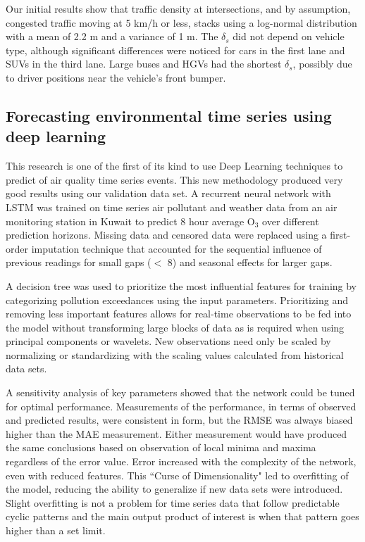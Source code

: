 Our initial results show that traffic density at intersections, and by assumption, congested traffic moving at 5 km/h or less, stacks using a log-normal distribution with a mean of 2.2 m and a variance of 1 m. The $\delta_{s}$ did not depend on vehicle type, although significant differences were noticed for cars in the first lane and SUVs in the third lane. Large buses and HGVs had the shortest $\delta_{s}$, possibly due to driver positions near the vehicle's front bumper. 

\subsection{Forecasting environmental time series using deep learning}
This research is one of the first of its kind to use Deep Learning techniques to predict of air quality time series events. This new methodology produced very good results using our validation data set. A recurrent neural network with LSTM was trained on time series air pollutant and weather data from an air monitoring station in Kuwait to predict 8 hour average O$_{3}$ over different prediction horizons. Missing data and censored data were replaced using a first-order imputation technique that accounted for the sequential influence of previous readings for small gaps ($<$ 8) and seasonal effects for larger gaps. 

A decision tree was used to prioritize the most influential features for training by categorizing pollution exceedances using the input parameters. Prioritizing and removing less important features allows for real-time observations to be fed into the model without transforming large blocks of data as is required when using principal components or wavelets. New observations need only be scaled by normalizing or standardizing with the scaling values calculated from historical data sets. 

A sensitivity analysis of key parameters showed that the network could be tuned for optimal performance. Measurements of the performance, in terms of observed and predicted results, were consistent in form, but the RMSE was always biased higher than the MAE measurement. Either measurement would have produced the same conclusions based on observation of local minima and maxima regardless of the error value. Error increased with the complexity of the network, even with reduced features. This ``Curse of Dimensionality" led to overfitting of the model, reducing the ability to generalize if new data sets were introduced. Slight overfitting is not a problem for time series data that follow predictable cyclic patterns and the main output product of interest is when that pattern goes higher than a set limit.


